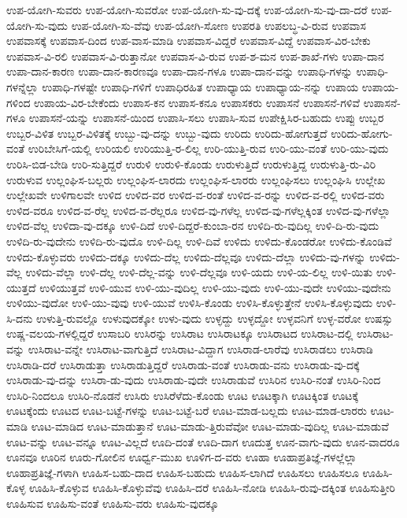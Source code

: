 {ಉಪ-ಯೋಗಿ-ಸುವರು
ಉಪ-ಯೋಗಿ-ಸುವರೋ
ಉಪ-ಯೋಗಿ-ಸು-ವು-ದಕ್ಕೆ
ಉಪ-ಯೋಗಿ-ಸು-ವು-ದಾ-ದರೆ
ಉಪ-ಯೋಗಿ-ಸು-ವುದು
ಉಪ-ಯೋಗಿ-ಸು-ವೆವು
ಉಪ-ಯೋಗಿ-ಸೋಣ
ಉಪರತಿ
ಉಪಲಬ್ಧ-ವಿ-ರುವ
ಉಪವಾಸ
ಉಪವಾಸಕ್ಕೆ
ಉಪವಾಸ-ದಿಂದ
ಉಪ-ವಾಸ-ಮಾಡಿ
ಉಪವಾಸ-ವಿದ್ದರೆ
ಉಪವಾಸ-ವಿದ್ದೆ
ಉಪವಾಸ-ವಿರ-ಬೇಕು
ಉಪವಾಸ-ವಿ-ರಲಿ
ಉಪವಾಸ-ವಿ-ರುತ್ತಾನೋ
ಉಪವಾಸ-ವಿ-ರುವ
ಉಪ-ಶ-ಮನ
ಉಪ-ಶಾಖೆ-ಗಳು
ಉಪಾ-ದಾನ
ಉಪಾ-ದಾನ-ಕಾರಣ
ಉಪಾ-ದಾನ-ಕಾರಣವೂ
ಉಪಾ-ದಾನ-ಗಳೂ
ಉಪಾ-ದಾನ-ವನ್ನು
ಉಪಾಧಿ-ಗಳನ್ನು
ಉಪಾಧಿ-ಗಳನ್ನೆಲ್ಲಾ
ಉಪಾಧಿ-ಗಳಷ್ಟೇ
ಉಪಾಧಿ-ಗಳಿಗೆ
ಉಪಾಧಿರಹಿತ
ಉಪಾಧ್ಯಾಯ
ಉಪಾಧ್ಯಾಯ-ನನ್ನು
ಉಪಾಯ
ಉಪಾಯ-ಗಳಿಂದ
ಉಪಾಯ-ವಿರ-ಬೇಕೆಂದು
ಉಪಾಸ-ಕನ
ಉಪಾಸ-ಕನೂ
ಉಪಾಸಕರು
ಉಪಾಸನೆ
ಉಪಾಸನೆ-ಗಳಿವೆ
ಉಪಾಸನೆ-ಗಳೂ
ಉಪಾಸನೆ-ಯನ್ನು
ಉಪಾಸನೆ-ಯಿಂದ
ಉಪಾಸಿ-ಸಲು
ಉಪಾಸಿ-ಸುವ
ಉಪೇಕ್ಷಿಸಿರ-ಬಹುದು
ಉಪ್ಪು
ಉಬ್ಬರ
ಉಬ್ಬರ-ವಿಳಿತ
ಉಬ್ಬರ-ವಿಳಿತಕ್ಕೆ
ಉಬ್ಬು-ವು-ದನ್ನು
ಉಬ್ಬು-ವುದು
ಉರಿದು
ಉರಿದು-ಹೋಗುತ್ತದೆ
ಉರಿದು-ಹೋಗು-ವಂತೆ
ಉರಿಬೇಸಿಗೆ-ಯಲ್ಲಿ
ಉರಿಯಲಿ
ಉರಿಯುತ್ತಿ-ರ-ಲಿಲ್ಲ
ಉರಿ-ಯುತ್ತಿ-ರುವ
ಉರಿ-ಯು-ವಂತೆ
ಉರಿ-ಯು-ವುದು
ಉರಿಸಿ-ಬಿಡ-ಬೇಡಿ
ಉರಿ-ಸುತ್ತಿದ್ದರೆ
ಉರುಳಿ
ಉರುಳಿ-ಕೊಂಡು
ಉರುಳುತ್ತಿದೆ
ಉರುಳುತ್ತಿದ್ದ
ಉರುಳುತ್ತಿ-ರು-ವಿರಿ
ಉರುಳುವ
ಉಲ್ಲಂಘಿಸ-ಬಲ್ಲರು
ಉಲ್ಲಂಘಿಸ-ಲಾರದು
ಉಲ್ಲಂಘಿಸ-ಲಾರರು
ಉಲ್ಲಂಘಿಸಲು
ಉಲ್ಲಂಘಿಸಿ
ಉಲ್ಲೇಖ
ಉಲ್ಲೇಖವೇ
ಉಳಿಗಾಲವೇ
ಉಳಿದ
ಉಳಿದ-ವರ
ಉಳಿದ-ವ-ರಂತೆ
ಉಳಿದ-ವ-ರನ್ನು
ಉಳಿದ-ವ-ರಲ್ಲಿ
ಉಳಿದ-ವರು
ಉಳಿದ-ವರೂ
ಉಳಿದ-ವ-ರೆಲ್ಲ
ಉಳಿದ-ವ-ರೆಲ್ಲರೂ
ಉಳಿದ-ವು-ಗಳೆಲ್ಲ
ಉಳಿದ-ವು-ಗಳೆಲ್ಲಕ್ಕಿಂತ
ಉಳಿದ-ವು-ಗಳೆಲ್ಲಾ
ಉಳಿದ-ವೆಲ್ಲ
ಉಳಿದಾ-ವು-ದಕ್ಕೂ
ಉಳಿ-ದಿದೆ
ಉಳಿ-ದಿದ್ದರೆ-ಕುಂಬಾ-ರನ
ಉಳಿದಿ-ರು-ವುದಿಲ್ಲ
ಉಳಿ-ದಿ-ರು-ವುದು
ಉಳಿದಿ-ರು-ವುದೇನು
ಉಳಿದಿ-ರು-ವುದೊ
ಉಳಿ-ದಿಲ್ಲ
ಉಳಿ-ದಿವೆ
ಉಳಿದು
ಉಳಿದು-ಕೊಂಡರೋ
ಉಳಿದು-ಕೊಂಡಿವೆ
ಉಳಿದು-ಕೊಳ್ಳುವರು
ಉಳಿದು-ದಕ್ಕೂ
ಉಳಿದು-ದೆಲ್ಲ
ಉಳಿದು-ದೆಲ್ಲವೂ
ಉಳಿದು-ದೆಲ್ಲಾ
ಉಳಿದು-ವು-ಗಳನ್ನು
ಉಳಿದು-ವೆಲ್ಲ
ಉಳಿದು-ವೆಲ್ಲಾ
ಉಳಿ-ದೆಲ್ಲ
ಉಳಿ-ದೆಲ್ಲ-ವನ್ನು
ಉಳಿ-ದೆಲ್ಲವೂ
ಉಳಿ-ಯದು
ಉಳಿ-ಯ-ಲಿಲ್ಲ
ಉಳಿ-ಯಿತು
ಉಳಿ-ಯುತ್ತದೆ
ಉಳಿಯುತ್ತವೆ
ಉಳಿ-ಯುವ
ಉಳಿ-ಯು-ವುದಿಲ್ಲ
ಉಳಿ-ಯು-ವುದು
ಉಳಿ-ಯು-ವುದೇ
ಉಳಿಯು-ವುದೇನು
ಉಳಿಯು-ವುದೋ
ಉಳಿ-ಯು-ವುವು
ಉಳಿ-ಯುವೆ
ಉಳಿಸಿ-ಕೊಂಡು
ಉಳಿಸಿ-ಕೊಳ್ಳುತ್ತೇನೆ
ಉಳಿಸಿ-ಕೊಳ್ಳುವುದು
ಉಳಿ-ಸಿ-ದನು
ಉಳುತ್ತಿ-ರುವಲ್ಲೊ
ಉಳುವುದಕ್ಕೋ
ಉಳು-ವುದು
ಉಳ್ಳದ್ದು
ಉಳ್ಳದ್ದೋ
ಉಳ್ಳವನಿಗೆ
ಉಳ್ಳ-ವರೋ
ಉಷಸ್ಸು
ಉಷ್ಣ-ವಲಯ-ಗಳಲ್ಲಿದ್ದರೆ
ಉಸಾಬರಿ
ಉಸಿರನ್ನು
ಉಸಿರಾಟ
ಉಸಿರಾಟಕ್ಕೂ
ಉಸಿರಾಟದ
ಉಸಿರಾಟ-ದಲ್ಲಿ
ಉಸಿರಾಟ-ವನ್ನು
ಉಸಿರಾಟ-ವನ್ನೇ
ಉಸಿರಾಟ-ವಾಗುತ್ತಿದೆ
ಉಸಿರಾಟ-ವಿದ್ದಾಗ
ಉಸಿರಾಡ-ಲಾರೆವು
ಉಸಿರಾಡಲು
ಉಸಿರಾಡಿ
ಉಸಿರಾಡಿ-ದರೆ
ಉಸಿರಾಡುತ್ತಾ
ಉಸಿರಾಡುತ್ತಿದ್ದರೆ
ಉಸಿರಾಡು-ವಂತೆ
ಉಸಿರಾಡು-ವನು
ಉಸಿರಾಡು-ವು-ದಕ್ಕೆ
ಉಸಿರಾಡು-ವು-ದನ್ನು
ಉಸಿರಾ-ಡು-ವುದು
ಉಸಿರಾಡು-ವುದೇ
ಉಸಿರಾಡುವೆ
ಉಸಿರಿನ
ಉಸಿರಿ-ನಂತೆ
ಉಸಿರಿ-ನಿಂದ
ಉಸಿರಿ-ನಿಂದಲೂ
ಉಸಿರಿ-ನೊಡನೆ
ಉಸಿರು
ಉಸಿರೆಳೆದು-ಕೊಂಡು
ಊಟ
ಊಟಕ್ಕಾಗಿ
ಊಟಕ್ಕಿಂತ
ಊಟಕ್ಕೆ
ಊಟಕ್ಕೆಂದು
ಊಟದ
ಊಟ-ಬಟ್ಟೆ-ಗಳನ್ನು
ಊಟ-ಬಟ್ಟೆ-ಬರೆ
ಊಟ-ಮಾಡ-ಬಲ್ಲದು
ಊಟ-ಮಾಡ-ಲಾರರು
ಊಟ-ಮಾಡಿ
ಊಟ-ಮಾಡಿದ
ಊಟ-ಮಾಡುತ್ತಾನೆ
ಊಟ-ಮಾಡು-ತ್ತಿರುವೆವೋ
ಊಟ-ಮಾಡು-ವುದಿಲ್ಲ
ಊಟ-ಮಾಡುವೆ
ಊಟ-ವನ್ನು
ಊಟ-ವನ್ನೂ
ಊಟ-ವಿಲ್ಲದೆ
ಊದಿ-ದಂತೆ
ಊದಿ-ದಾಗ
ಊದುತ್ತ
ಊನ-ವಾಗು-ವುದು
ಊನ-ವಾದರೂ
ಊನವೂ
ಊರಿನ
ಊರು-ಗೋಲಿನ
ಊರ್ಧ್ವ-ಮುಖ
ಊಳಿಗ-ದ-ವರು
ಊಹಾ
ಊಹಾಪ್ರತಿಜ್ಞೆ-ಗಳಲ್ಲೆಲ್ಲಾ
ಊಹಾಪ್ರತಿಜ್ಞೆ-ಗಳಾಗಿ
ಊಹಿಸ-ಬಹು-ದಾದ
ಊಹಿಸ-ಬಹುದು
ಊಹಿಸ-ಲಾಗಿದೆ
ಊಹಿಸಲು
ಊಹಿಸಲೂ
ಊಹಿಸಿ-ಕೊಳ್ಳ
ಊಹಿಸಿ-ಕೊಳ್ಳುವ
ಊಹಿಸಿ-ಕೊಳ್ಳುವೆವು
ಊಹಿಸಿ-ದರೆ
ಊಹಿಸಿ-ನೋಡಿ
ಊಹಿಸಿ-ರುವು-ದಕ್ಕಿಂತ
ಊಹಿಸುತ್ತೀರಿ
ಊಹಿಸುವ
ಊಹಿಸು-ವಂತೆ
ಊಹಿಸು-ವರು
ಊಹಿಸು-ವುದಕ್ಕೂ
}
